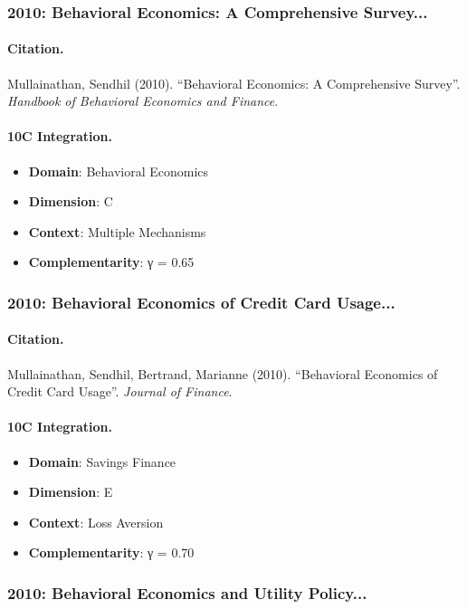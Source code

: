 \subsubsection{2010: Behavioral Economics: A Comprehensive Survey...}

\paragraph{Citation.}
Mullainathan, Sendhil (2010). ``Behavioral Economics: A Comprehensive Survey''. \textit{Handbook of Behavioral Economics and Finance}.

\paragraph{10C Integration.}
\begin{itemize}[nosep]
  \item \textbf{Domain}: Behavioral Economics
  \item \textbf{Dimension}: C
  \item \textbf{Context}: Multiple Mechanisms
  \item \textbf{Complementarity}: γ = 0.65
\end{itemize}


\subsubsection{2010: Behavioral Economics of Credit Card Usage...}

\paragraph{Citation.}
Mullainathan, Sendhil, Bertrand, Marianne (2010). ``Behavioral Economics of Credit Card Usage''. \textit{Journal of Finance}.

\paragraph{10C Integration.}
\begin{itemize}[nosep]
  \item \textbf{Domain}: Savings Finance
  \item \textbf{Dimension}: E
  \item \textbf{Context}: Loss Aversion
  \item \textbf{Complementarity}: γ = 0.70
\end{itemize}


\subsubsection{2010: Behavioral Economics and Utility Policy...}

